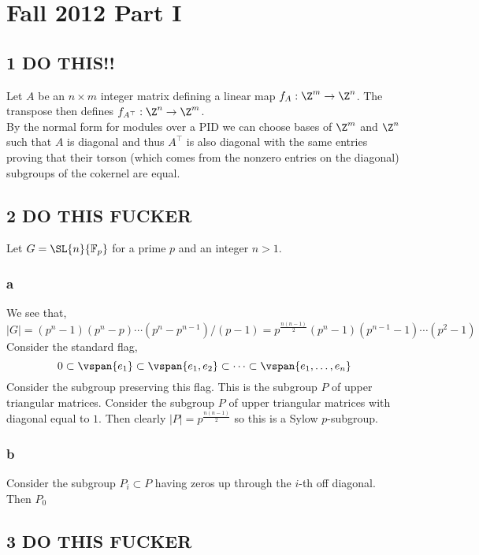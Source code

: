 \documentclass[12pt]{article}
\renewcommand{\F}{\mathbb{F}}
\begin{document}
\section{Fall 2012 Part I}

\subsection{1 DO THIS!!}

Let $A$ be an $n \times m$ integer matrix defining a linear map $f_A : \Z^m \to \Z^n$. The transpose then defines $f_{A^\top} : \Z^n \to \Z^m$. 
\bigskip\\
By the normal form for modules over a PID we can choose bases of $\Z^m$ and $\Z^n$ such that $A$ is diagonal and thus $A^\top$ is also diagonal with the same entries proving that their torson (which comes from the nonzero entries on the diagonal) subgroups of the cokernel are equal.

\subsection{2 DO THIS FUCKER}

Let $G = \SL{n}{\F_p}$ for a prime $p$ and an integer $n > 1$. 

\subsubsection{a}

We see that,
\[ |G| = (p^n - 1)(p^n - p) \cdots (p^n - p^{n-1})/(p-1) = p^{\frac{n(n-1)}{2}} (p^n - 1) (p^{n-1} - 1) \cdots (p^2 - 1) \]
Consider the standard flag,
\[ 0 \subset \vspan{e_1} \subset \vspan{e_1, e_2} \subset \cdots \subset \vspan{e_1, \dots, e_n} \]
Consider the subgroup preserving this flag. This is the subgroup $P$ of upper triangular matrices. Consider the subgroup $P$ of upper triangular matrices with diagonal equal to $1$. Then clearly $|P| = p^{\frac{n(n-1)}{2}}$ so this is a Sylow $p$-subgroup. 

\subsubsection{b}

Consider the subgroup $P_i \subset P$ having zeros up through the $i$-th off diagonal. Then $P_0$ 

\subsection{3 DO THIS FUCKER}
\end{document}
